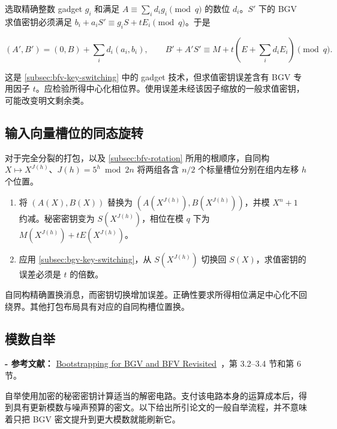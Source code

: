 选取精确整数 gadget $g_i$ 和满足 $A\equiv\sum_i d_ig_i\pmod q$ 的数位 $d_i$。$S'$ 下的 BGV 求值密钥必须满足 $b_i+a_iS'\equiv g_iS+tE_i\pmod q$。于是
\begin{tcolorbox}[title={\textbf{\tboxlabel{\ref*{subsec:bgv-key-switching}} BGV 密钥切换}}]
\[
(A',B')=(0,B)+\sum_i d_i(a_i,b_i),\qquad
B'+A'S'\equiv M+t\left(E+\sum_i d_iE_i\right)\pmod q.
\]
\end{tcolorbox}
这是 \autoref{subsec:bfv-key-switching} 中的 gadget 技术，但求值密钥误差含有 BGV 专用因子 $t$。应检验所得中心化相位界。使用误差未经该因子缩放的一般求值密钥，可能改变明文剩余类。

\subsection{输入向量槽位的同态旋转}
\label{subsec:bgv-rotation}

对于完全分裂的打包，以及 \autoref{subsec:bfv-rotation} 所用的根顺序，自同构 $X\mapsto X^{J(h)}$、$J(h)=5^h\bmod2n$ 将两组各含 $n/2$ 个标量槽位分别在组内左移 $h$ 个位置。
\begin{tcolorbox}[title={\textbf{\tboxlabel{\ref*{subsec:bgv-rotation}} BGV 输入向量槽位的同态旋转}}]
\begin{enumerate}
\item 将 $(A(X),B(X))$ 替换为 $(A(X^{J(h)}),B(X^{J(h)}))$，并模 $X^n+1$ 约减。秘密密钥变为 $S(X^{J(h)})$，相位在模 $q$ 下为 $M(X^{J(h)})+tE(X^{J(h)})$。
\item 应用 \autoref{subsec:bgv-key-switching}，从 $S(X^{J(h)})$ 切换回 $S(X)$，求值密钥的误差必须是 $t$ 的倍数。
\end{enumerate}
\end{tcolorbox}
自同构精确置换消息，而密钥切换增加误差。正确性要求所得相位满足中心化不回绕界。其他打包布局具有对应的自同构槽位置换。


\subsection{模数自举}
\label{subsec:bgv-bootstrapping}

\noindent \textbf{- 参考文献：} \href{https://eprint.iacr.org/2022/1363}{Bootstrapping for BGV and BFV Revisited}~\cite{cryptoeprint:2022/1363}，第 3.2--3.4 节和第 6 节。

自举使用加密的秘密密钥计算适当的解密电路。支付该电路本身的运算成本后，得到具有更新模数与噪声预算的密文。以下给出所引论文的一般自举流程，并不意味着只把 BGV 密文提升到更大模数就能刷新它。

